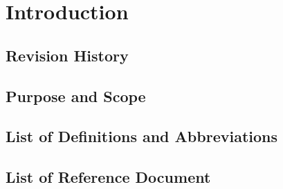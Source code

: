 \chapter{Introduction}
\section{Revision History}
\section{Purpose and Scope}
\section{List of Definitions and Abbreviations}
\section{List of Reference Document}